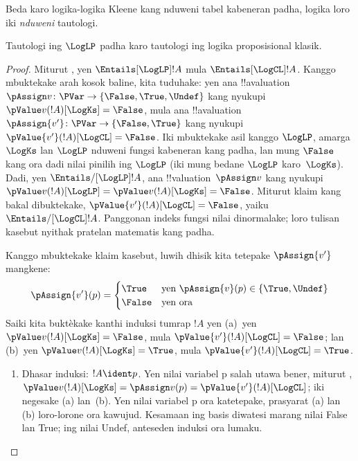 \documentclass[../../../include/open-logic-section]{subfiles}
\begin{document}
Beda karo logika-logika Kleene kang nduweni tabel kabeneran
padha, logika loro iki \emph{nduweni} tautologi.

\begin{prop} Tautologi ing $\LogLP$
  padha karo tautologi ing logika proposisional klasik.
\end{prop}

\begin{proof}
  Miturut , yen $\Entails[\LogLP] !A$
  mula $\Entails[\LogCL] !A$. Kanggo mbuktekake arah kosok baline,
  kita tuduhake: yen ana !!a{valuation}~$\pAssign v\colon \PVar \to
  \{\False, \True, \Undef\}$ kang nyukupi $\pValue v(!A)[\LogKs]
  = \False$, mula ana !!a{valuation}~$\pAssign {v'}\colon \PVar \to
  \{\False, \True\}$ kang nyukupi $\pValue {v'}(!A)[\LogCL] =
  \False$. Iki mbuktekake asil kanggo $\LogLP$, amarga $\LogKs$
  lan $\LogLP$ nduweni fungsi kabeneran kang padha, lan mung
  $\False$ kang ora dadi nilai pinilih ing $\LogLP$ (iki mung
  bedane $\LogLP$ karo~$\LogKs$). Dadi, yen $\Entails/[\LogLP]
  !A$, ana !!{valuation}~$\pAssign v$ kang nyukupi $\pValue
  v(!A)[\LogLP] = \pValue v(!A)[\LogKs] = \False$. Miturut klaim
  kang bakal dibuktekake, $\pValue{v'}(!A)[\LogCL] = \False$,
  yaiku $\Entails/[\LogCL] !A$. Panggonan indeks fungsi nilai dinormalake; loro tulisan kasebut nyithak pratelan matematis kang padha.

Kanggo mbuktekake klaim kasebut, luwih dhisik kita tetepake
  $\pAssign {v'}$ mangkene:
  \[
    \pAssign {v'}(p) =
    \begin{cases}
    \True & \text{yen } \pAssign {v}(p) \in \{\True, \Undef\}\\
    \False & \text{yen ora}
  \end{cases}
  \]
  Saiki kita buktèkake kanthi induksi tumrap $!A$ yen (a)~yen
  $\pValue v(!A)[\LogKs] = \False$, mula $\pValue {v'}(!A)[\LogCL]
  = \False$; lan (b)~yen $\pValue v(!A)[\LogKs] = \True$, mula
  $\pValue {v'}(!A)[\LogCL] = \True$.
  \begin{enumerate}
    \item Dhasar induksi: $!A \ident p$. Yen nilai variabel p salah utawa
    bener, miturut ,
    $\pValue v(!A)[\LogKs] = \pAssign v(p) = \pValue {v'}(!A)[\LogCL]$;
    iki negesake (a) lan~(b). Yen nilai variabel p ora katetepake,
    prasyarat (a) lan (b) loro-lorone ora kawujud. Kesamaan ing basis diwatesi marang nilai False lan True; ing nilai Undef, anteseden induksi ora lumaku.


\end{enumerate}
\end{proof}
\end{document}
